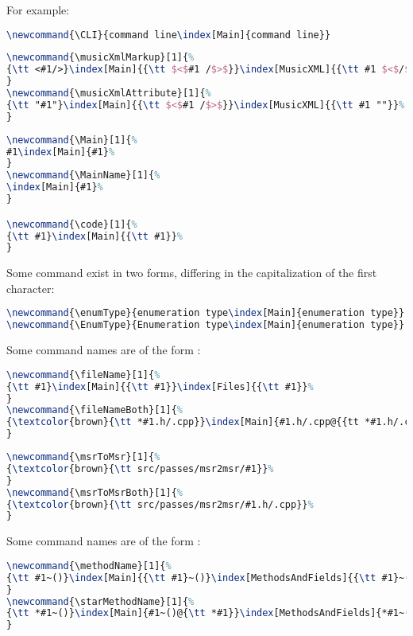 For example:
\begin{lstlisting}[language=Latex]
\newcommand{\CLI}{command line\index[Main]{command line}}
\end{lstlisting}

\begin{lstlisting}[language=Latex]
\newcommand{\musicXmlMarkup}[1]{%
{\tt <#1/>}\index[Main]{{\tt $<$#1 /$>$}}\index[MusicXML]{{\tt #1 $<$/$>$}}%
}
\newcommand{\musicXmlAttribute}[1]{%
{\tt "#1"}\index[Main]{{\tt $<$#1 /$>$}}\index[MusicXML]{{\tt #1 ""}}%
}
\end{lstlisting}

\begin{lstlisting}[language=Latex]
\newcommand{\Main}[1]{%
#1\index[Main]{#1}%
}
\newcommand{\MainName}[1]{%
\index[Main]{#1}%
}

\newcommand{\code}[1]{%
{\tt #1}\index[Main]{{\tt #1}}%
}
\end{lstlisting}

Some command exist in two forms, differing in the capitalization of the first character:
\begin{lstlisting}[language=Latex]
\newcommand{\enumType}{enumeration type\index[Main]{enumeration type}}
\newcommand{\EnumType}{Enumeration type\index[Main]{enumeration type}}
\end{lstlisting}

Some command names are of the form :
\begin{lstlisting}[language=Latex]
\newcommand{\fileName}[1]{%
{\tt #1}\index[Main]{{\tt #1}}\index[Files]{{\tt #1}}%
}
\newcommand{\fileNameBoth}[1]{%
{\textcolor{brown}{\tt *#1.h/.cpp}}\index[Main]{#1.h/.cpp@{{tt *#1.h/.cpp}}}\index[Files]{#1.h/.cpp@{{tt *#1.h/.cpp}}}%
}
\end{lstlisting}

\begin{lstlisting}[language=Latex]
\newcommand{\msrToMsr}[1]{%
{\textcolor{brown}{\tt src/passes/msr2msr/#1}}%
}
\newcommand{\msrToMsrBoth}[1]{%
{\textcolor{brown}{\tt src/passes/msr2msr/#1.h/.cpp}}%
}
\end{lstlisting}

Some command names are of the form :
\begin{lstlisting}[language=Latex]
\newcommand{\methodName}[1]{%
{\tt #1~()}\index[Main]{{\tt #1}~()}\index[MethodsAndFields]{{\tt #1}~()}%
}
\newcommand{\starMethodName}[1]{%
{\tt *#1~()}\index[Main]{#1~()@{\tt *#1}}\index[MethodsAndFields]{*#1~()@{\tt *#1~()}}%
}
\end{lstlisting}


